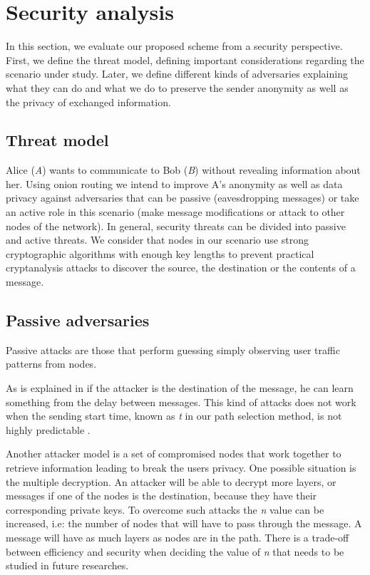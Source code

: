 \section{Security analysis}\label{sec:sanalysis}


In this section, we evaluate our proposed scheme from a security perspective. First, we define the threat model, defining important considerations regarding the scenario under study. Later, we define different kinds of adversaries explaining what they can do and what we do to preserve the sender anonymity as well as the privacy of exchanged information.

\subsection{Threat model}

Alice (\textit{A}) wants to communicate to Bob (\textit{B}) without revealing information about her. Using onion routing we intend to improve A's anonymity as well as data privacy against adversaries that can be passive (eavesdropping messages) or take an active role in this scenario (make message modifications or attack to other nodes of the network). In general, security threats can be divided into passive and active threats. We consider that nodes in our scenario use strong cryptographic algorithms with enough key lengths to prevent practical cryptanalysis attacks to discover the source, the destination or the contents of a message. 

\subsection{Passive adversaries}

Passive attacks are those that perform guessing simply observing user traffic patterns from nodes. 

As is explained in \cite{latency-leak} if the attacker is the destination of the message, he can learn something from the delay between messages.  This kind of attacks does not work when the sending start time, known as \textit{t} in our path selection method, is not highly predictable \cite{enpassant}.

Another attacker model is a set of compromised nodes that work together to retrieve information leading to break the users privacy. One possible situation is the multiple decryption. An attacker will be able to decrypt more layers, or messages if one of the nodes is the destination, because they have their corresponding private keys. To overcome such attacks the \textit{n} value can be increased, i.e: the number of nodes that will have to pass through the message. A message will have as much layers as nodes are in the path. There is a trade-off between efficiency and security when deciding the value of \textit{n} that needs to be studied in future researches. 

